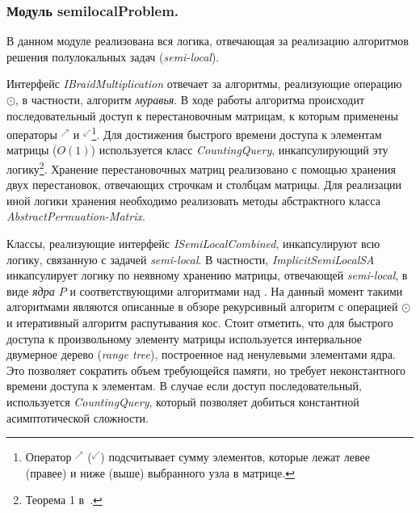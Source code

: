 \subsubsection{Модуль semilocalProblem.}
В данном модуле реализована вся логика, отвечающая за реализацию  алгоритмов решения полулокальных задач (\emph{semi-local}).

Интерфейс \emph{IBraidMultiplication} отвечает за алгоритмы, реализующие операцию $\odot$, в частности, алгоритм \emph{муравья}.
В ходе работы алгоритма происходит последовательный доступ к перестановочным матрицам, к которым применены операторы $^{\nearrow}$ и $^{\swarrow}$\footnote{Оператор $^{\nearrow}$ ($^{\swarrow}$)  подсчитывает сумму элементов, которые лежат левее (правее) и ниже (выше) выбранного узла в матрице.}.
Для достижения быстрого времени доступа к элементам  матрицы ($O(1)$) используется
класс \emph{CountingQuery}, инкапсулирующий эту логику\footnote{Теорема 1 в~\cite{tiskin2015fast}.}.
% 
Хранение перестановочных матриц реализовано с помощью хранения двух перестановок, отвечающих строчкам и столбцам матрицы.
Для реализации иной логики хранения необходимо реализовать методы абстрактного класса \emph{AbstractPermuation-Matrix}.

Классы, реализующие интерфейс \emph{ISemiLocalCombined}, инкапсулируют всю логику, связанную с  задачей \emph{semi-local}.
В частности, \emph{ImplicitSemiLocalSA} инкапсулирует логику по неявному хранению матрицы, отвечающей  \emph{semi-local}, в виде \emph{ядра $P$} и соответствующими алгоритмами над .
На данный момент такими алгоритмами являются описанные в обзоре рекурсивный алгоритм с операцией $\odot$ и итеративный алгоритм распутывания кос.
Стоит отметить, что для быстрого доступа к произвольному элементу матрицы  используется интервальное двумерное дерево (\emph{range tree}), построенное над ненулевыми элементами ядра.
Это позволяет сократить объем требующейся памяти, но требует неконстантного времени доступа к элементам.
В случае если доступ последовательный, используется  \emph{CountingQuery}, который позволяет добиться константной асимптотической сложности.

